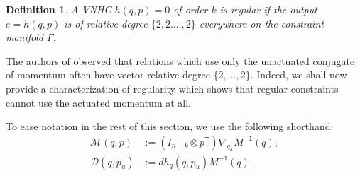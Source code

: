 \documentclass[journal,twoside,web]{ieeecolor}
\newtheorem{defn}[thm]{Definition} %
\newcommand*{\tpose}{^\mathsf{T}}
\newcommand*{\Minv}{M^\mathsf{-1}}
\newcommand*{\Id}[1]{I_{#1}}
\begin{document}
\begin{defn}
    A VNHC \(h(q,p) = 0\) of order \(k\) is \textit{regular} if the output 
    \(e = h(q,p)\) is of relative degree \(\{2,2.\ldots,2\}\) everywhere on the
    constraint manifold \(\Gamma\).
\end{defn}


The authors of
\cite{nhvc_dynamic_walking,hybrid_zero_dynamics_bipedal_nhvcs,nhvc_incline_walking}
observed that relations which use only the unactuated conjugate of momentum
often have vector relative degree \(\{2,\ldots,2\}\).
Indeed, we shall now provide a characterization of regularity which shows that
regular constraints cannot use the actuated momentum at all.

To ease notation in the rest of this section, we use the following shorthand:
\begin{align}
    \mathcal{M}(q,p) &:= (\Id{n-k} \otimes p\tpose)\nabla_{q_u}\Minv(q) 
        ,\\
    \mathcal{D}(q,p_u) &:= dh_q(q,p_u) \Minv(q) 
    .
\end{align}
\end{document}

